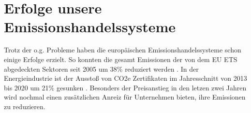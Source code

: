 \section{Erfolge unsere Emissionshandelssysteme}

Trotz der o.g. Probleme haben die europäischen Emissionshandelssysteme schon einige Erfolge erzielt. So konnten die gesamt Emissionen der von dem EU ETS abgedeckten Sektoren seit 2005 um 38\% reduziert werden \cite{dehst3.2023}.
In der Energieindustrie ist der Ausstoß von CO2e Zertifikaten im Jahresschnitt von 2013 bis 2020 um 21\% gesunken \cite{ub3.2023}. 
Besonders der Preisanstieg in den letzen zwei Jahren wird nochmal einen zusätzlichen Anreiz für Unternehmen bieten, ihre Emissionen zu reduzieren. 